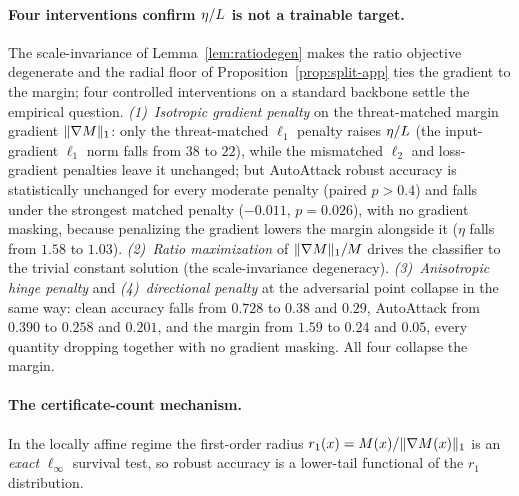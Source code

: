 \paragraph{Four interventions confirm $\eta/L$ is not a trainable target.} The
scale-invariance of Lemma~\ref{lem:ratiodegen} makes the ratio objective
degenerate and the radial floor of Proposition~\ref{prop:split-app} ties the
gradient to the margin; four controlled interventions on a standard backbone
settle the empirical question. \emph{(1)~Isotropic gradient penalty} on the
threat-matched margin gradient $\lVert\nabla M\rVert_1$: only the threat-matched
$\ell_1$ penalty raises $\eta/L$ (the input-gradient $\ell_1$ norm falls from $38$
to $22$), while the mismatched $\ell_2$ and loss-gradient penalties
\citep{ross2018improving,finlay2021scaleable} leave it unchanged; but AutoAttack
robust accuracy is statistically unchanged for every moderate penalty (paired
$p>0.4$) and falls under the strongest matched penalty ($-0.011$, $p=0.026$), with
no gradient masking, because penalizing the gradient lowers the margin alongside
it ($\eta$ falls from $1.58$ to $1.03$). \emph{(2)~Ratio maximization} of
$\lVert\nabla M\rVert_1/M$ drives the classifier to the trivial constant solution
(the scale-invariance degeneracy). \emph{(3)~Anisotropic hinge penalty} and
\emph{(4)~directional penalty} at the adversarial point collapse in the same way:
clean accuracy falls from $0.728$ to $0.38$ and $0.29$, AutoAttack from $0.390$
to $0.258$ and $0.201$, and the margin from $1.59$ to $0.24$ and $0.05$, every
quantity dropping together with no gradient masking. All four collapse the margin.

\paragraph{The certificate-count mechanism.} In the locally affine regime the
first-order radius $r_1(x)=M(x)/\lVert\nabla M(x)\rVert_1$ is an \emph{exact}
$\ell_\infty$ survival test, so robust accuracy is a lower-tail functional of the
$r_1$ distribution.

